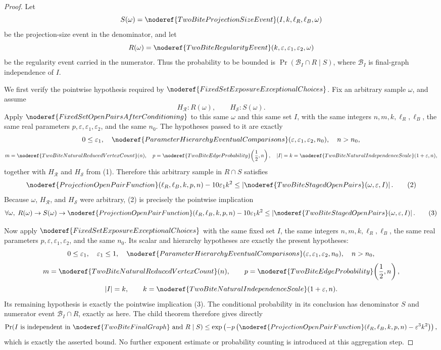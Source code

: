 \begin{proof}
Let
\[
S(\omega)=
\noderef{TwoBiteProjectionSizeEvent}(I,k,\ell_R,\ell_B,\omega)
\]
be the projection-size event in the denominator, and let
\[
R(\omega)=
\noderef{TwoBiteRegularityEvent}(k,\varepsilon,\varepsilon_1,\varepsilon_2,\omega)
\]
be the regularity event carried in the numerator.  Thus the probability to be
bounded is
\(\Pr(\mathcal B_I\cap R\mid S)\), where \(\mathcal B_I\) is final-graph
independence of \(I\).

We first verify the pointwise hypothesis required by
\(\noderef{FixedSetExposureExceptionalChoices}\).  Fix an arbitrary sample
\(\omega\), and assume
\[
H_{\mathcal R}:R(\omega),\qquad H_{\mathcal S}:S(\omega).
\tag{1}
\]
Apply \(\noderef{FixedSetOpenPairsAfterConditioning}\) to this same
\(\omega\) and this same set \(I\), with the same integers
\(n,m,k,\ell_R,\ell_B\), the same real parameters
\(p,\varepsilon,\varepsilon_1,\varepsilon_2\), and the same \(n_0\).
The hypotheses passed to it are exactly
\[
0\le\varepsilon_1,\quad
\noderef{ParameterHierarchyEventualComparisons}
(\varepsilon,\varepsilon_1,\varepsilon_2,n_0),\quad
n>n_0,
\]
\[
m=\noderef{TwoBiteNaturalReducedVertexCount}(n),\quad
p=\noderef{TwoBiteEdgeProbability}\!\left(\frac12,n\right),\quad
|I|=k=\noderef{TwoBiteNaturalIndependenceScale}(1+\varepsilon,n),
\]
together with \(H_{\mathcal R}\) and \(H_{\mathcal S}\) from (1).  Therefore
this arbitrary sample in \(R\cap S\) satisfies
\[
\noderef{ProjectionOpenPairFunction}(\ell_R,\ell_B,k,p,n)
-10\varepsilon_1k^2
\le
\left|\noderef{TwoBiteStagedOpenPairs}(\omega,\varepsilon,I)\right|.
\tag{2}
\]
Because \(\omega\), \(H_{\mathcal R}\), and \(H_{\mathcal S}\) were arbitrary,
(2) is precisely the pointwise implication
\[
\forall\omega,\;
R(\omega)\to S(\omega)\to
\noderef{ProjectionOpenPairFunction}(\ell_R,\ell_B,k,p,n)
-10\varepsilon_1k^2
\le
\left|\noderef{TwoBiteStagedOpenPairs}(\omega,\varepsilon,I)\right|.
\tag{3}
\]

Now apply \(\noderef{FixedSetExposureExceptionalChoices}\) with the same
fixed set \(I\), the same integers \(n,m,k,\ell_R,\ell_B\), the same real
parameters \(p,\varepsilon,\varepsilon_1,\varepsilon_2\), and the same
\(n_0\).  Its scalar and hierarchy hypotheses are exactly the present
hypotheses:
\[
0\le\varepsilon_1,\quad \varepsilon_1\le1,\quad
\noderef{ParameterHierarchyEventualComparisons}
(\varepsilon,\varepsilon_1,\varepsilon_2,n_0),\quad n>n_0,
\]
\[
m=\noderef{TwoBiteNaturalReducedVertexCount}(n),\qquad
p=\noderef{TwoBiteEdgeProbability}\!\left(\frac12,n\right),
\]
\[
|I|=k,\qquad
k=\noderef{TwoBiteNaturalIndependenceScale}(1+\varepsilon,n).
\]
Its remaining hypothesis is exactly the pointwise implication (3).  The
conditional probability in its conclusion has denominator \(S\) and numerator
event \(\mathcal B_I\cap R\), exactly as here.  The child theorem therefore
gives directly
\[
\Pr(I\text{ is independent in }\noderef{TwoBiteFinalGraph}
     \text{ and }R\mid S)
\le
\exp\left(-p\left(
\noderef{ProjectionOpenPairFunction}(\ell_R,\ell_B,k,p,n)
-\varepsilon^3k^2\right)\right),
\]
which is exactly the asserted bound.  No further exponent estimate or
probability counting is introduced at this aggregation step.
\end{proof}
